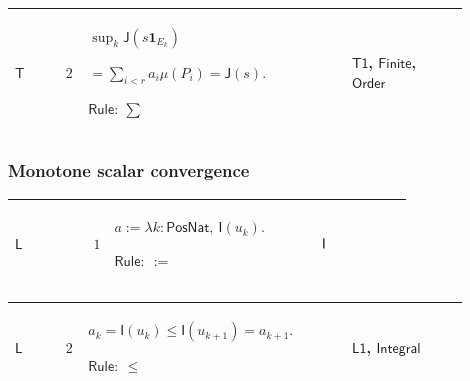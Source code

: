 \documentclass[12pt,reqno]{amsart}
\theoremstyle{blueplain}
\numberwithin{equation}{section}
\newlength{\DCTOneColumnBody}
\begin{document}
{\scriptsize \setlength{\parskip}{0pt}\nointerlineskip
\noindent 
\begin{tabular}{|@{}>{\centering\arraybackslash}m{0.10658\linewidth}|>{\centering\arraybackslash}m{0.03553\linewidth}|>{\centering\arraybackslash}m{0.52105\linewidth}|>{\centering\arraybackslash}m{0.23684\linewidth}|}
\hline
\hypertarget{proof:T2}{$\displaystyle \mathsf{T}$} & $\displaystyle 2$ & $%
\displaystyle \sup_k\mathsf{J}(s\mathbf{1}_{E_k})$\par$\displaystyle %
{}=\sum_{i<r}a_i\mu(P_i)=\mathsf{J}(s).$\par$\displaystyle \mathsf{Rule}:\
\sum$ & \hyperlink{proof:T1}{$\displaystyle \mathsf{T1}$}, \hyperlink{lem:Finite}%
{$\displaystyle \mathsf{Finite}$}, \hyperlink{ax:Order}{$\displaystyle 
\mathsf{Order}$} \\ \hline
\end{tabular}%
}

\subsubsection{\protect\scriptsize Monotone scalar convergence}

{\scriptsize \setlength{\parskip}{0pt}\nointerlineskip
\noindent 
\begin{tabular}{|@{}>{\centering\arraybackslash}m{\DCTOneColumnBody}|}
\hline
$\displaystyle \mathsf{Context\_L}:=$\par$\displaystyle u:\mathsf{PosNat}\to%
\mathsf{F},\quad\mathsf{Mono}(u),$\par$\displaystyle \forall k:\mathsf{PosNat%
},\ \mathsf{Measurable}(u_k).$ \\ \hline
\end{tabular}%
}

{\scriptsize \setlength{\parskip}{0pt}\nointerlineskip
\noindent 
\begin{tabular}{|@{}>{\centering\arraybackslash}m{0.10658\linewidth}|>{\centering\arraybackslash}m{0.03553\linewidth}|>{\centering\arraybackslash}m{0.52105\linewidth}|>{\centering\arraybackslash}m{0.23684\linewidth}|}
\hline
\hypertarget{proof:L1}{$\displaystyle \mathsf{L}$} & $\displaystyle 1$ & $%
\displaystyle a:=\lambda k:\mathsf{PosNat},\ \mathsf{I}(u_k).$\par$%
\displaystyle \mathsf{Rule}:\ :=$ & \hyperlink{def:I}{$\displaystyle \mathsf{%
I}$} \\ \hline
\end{tabular}%
}

{\scriptsize \setlength{\parskip}{0pt}\nointerlineskip
\noindent 
\begin{tabular}{|@{}>{\centering\arraybackslash}m{0.10658\linewidth}|>{\centering\arraybackslash}m{0.03553\linewidth}|>{\centering\arraybackslash}m{0.52105\linewidth}|>{\centering\arraybackslash}m{0.23684\linewidth}|}
\hline
\hypertarget{proof:L2}{$\displaystyle \mathsf{L}$} & $\displaystyle 2$ & $%
\displaystyle a_k=\mathsf{I}(u_k)\le\mathsf{I}(u_{k+1})=a_{k+1}.$\par$%
\displaystyle \mathsf{Rule}:\ \le$ & \hyperlink{proof:L1}{$\displaystyle 
\mathsf{L1}$}, \hyperlink{lem:Integral}{$\displaystyle \mathsf{Integral}$}
\\ \hline
\end{tabular}%
}
\end{document}
